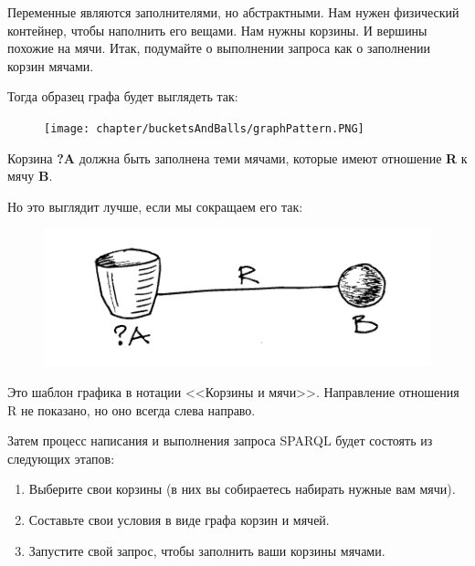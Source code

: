Переменные являются заполнителями, но абстрактными. Нам нужен физический контейнер, чтобы наполнить его вещами. Нам нужны корзины. И вершины похожие на мячи. Итак, подумайте о выполнении запроса как о заполнении корзин мячами.

Тогда образец графа будет выглядеть так:
\begin{figure}[h]
\texttt{[image: chapter/bucketsAndBalls/graphPattern.PNG]}
\end{figure}

Корзина \textbf{?A} должна быть заполнена теми мячами, которые имеют отношение \textbf{R} к мячу \textbf{B}.

Но это выглядит лучше, если мы сокращаем его так:
\begin{figure}[h]
\includegraphics[width=0.6\linewidth]{graphics/chapter/bucketsAndBalls/graphPatternBucketsBalls.PNG}
\end{figure}

Это шаблон графика в нотации <<Корзины и мячи>>. Направление отношения R не показано, но оно всегда слева направо.

Затем процесс написания и выполнения запроса SPARQL будет состоять из следующих этапов:
\begin{enumerate}
    \item Выберите свои корзины (в них вы собираетесь набирать нужные вам мячи).
    \item Составьте свои условия в виде графа корзин и мячей.
    \item Запустите свой запрос, чтобы заполнить ваши корзины мячами.
\end{enumerate}
